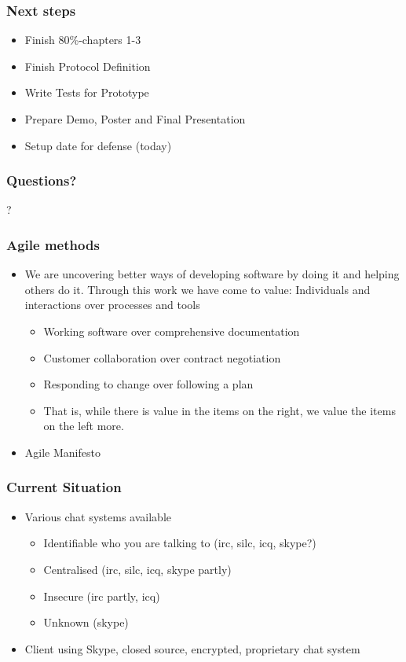 \documentclass{beamer}
\begin{document}
\frame
{
  \frametitle{Next steps}
  \begin{itemize}
    \item Finish 80\%-chapters 1-3
    \item Finish Protocol Definition
    \item Write Tests for Prototype
    \item Prepare Demo, Poster and Final Presentation
    \item Setup date for defense (today)
  \end{itemize}
}

\frame
{
  \frametitle{Questions?}
  \begin{center}
  ?
  \end{center}
}


\frame
{
  \frametitle{Agile methods}
  \begin{itemize}
    \item 
      We are uncovering better ways of developing software by doing it and helping others do it. Through this work we have come to value:
      Individuals and interactions over processes and tools
      \begin{itemize}
      \item Working software over comprehensive documentation
      \item Customer collaboration over contract negotiation
      \item Responding to change over following a plan
      \item That is, while there is value in the items on the right, we value the items on the left more.
      \end{itemize}
    \item Agile Manifesto
  \end{itemize}
}


\frame
{
  \frametitle{Current Situation}
  \begin{itemize}
      \item Various chat systems available
      \begin{itemize}
          \item Identifiable who you are talking to (irc, silc, icq, skype?)
          \item Centralised (irc, silc, icq, skype partly)
          \item Insecure (irc partly, icq)
          \item Unknown (skype)
      \end{itemize}
      \item Client using Skype, closed source, encrypted, proprietary chat system
  \end{itemize}
}
\end{document}
